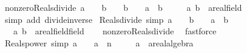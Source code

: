 \begin{isabellebody}
\ nonzero{\isacharunderscore}{\kern0pt}Reals{\isacharunderscore}{\kern0pt}divide{\isacharcolon}{\kern0pt}\ {\isachardoublequoteopen}a\ {\isasymin}\ {\isasymreal}\ {\isasymLongrightarrow}\ b\ {\isasymin}\ {\isasymreal}\ {\isasymLongrightarrow}\ b\ {\isasymnoteq}\ {}\ {\isasymLongrightarrow}\ a\ {\isacharslash}{\kern0pt}\ b\ {\isasymin}\ {\isasymreal}{\isachardoublequoteclose}\isanewline
\ \ \ a\ b\ {\isacharcolon}{\kern0pt}{\isacharcolon}{\kern0pt}\ {\isachardoublequoteopen}{\isacharprime}{\kern0pt}a{\isacharcolon}{\kern0pt}{\isacharcolon}{\kern0pt}real{\isacharunderscore}{\kern0pt}field{\isachardoublequoteclose}\isanewline
%
\isadelimproof
\ \ %
\endisadelimproof
%
\isatagproof
{}\isamarkupfalse%
\ {\isacharparenleft}{\kern0pt}simp\ add{\isacharcolon}{\kern0pt}\ divide{\isacharunderscore}{\kern0pt}inverse{\isacharparenright}{\kern0pt}%
\endisatagproof
{\isafoldproof}%
%
\isadelimproof
\isanewline
%
\endisadelimproof
\isanewline
{}\isamarkupfalse%
\ Reals{\isacharunderscore}{\kern0pt}divide\ {\isacharbrackleft}{\kern0pt}simp{\isacharbrackright}{\kern0pt}{\isacharcolon}{\kern0pt}\ {\isachardoublequoteopen}a\ {\isasymin}\ {\isasymreal}\ {\isasymLongrightarrow}\ b\ {\isasymin}\ {\isasymreal}\ {\isasymLongrightarrow}\ a\ {\isacharslash}{\kern0pt}\ b\ {\isasymin}\ {\isasymreal}{\isachardoublequoteclose}\isanewline
\ \ \ a\ b\ {\isacharcolon}{\kern0pt}{\isacharcolon}{\kern0pt}\ {\isachardoublequoteopen}{\isacharprime}{\kern0pt}a{\isacharcolon}{\kern0pt}{\isacharcolon}{\kern0pt}{\isacharbraceleft}{\kern0pt}real{\isacharunderscore}{\kern0pt}field{\isacharcomma}{\kern0pt}field{\isacharbraceright}{\kern0pt}{\isachardoublequoteclose}\isanewline
%
\isadelimproof
\ \ %
\endisadelimproof
%
\isatagproof
{}\isamarkupfalse%
\ nonzero{\isacharunderscore}{\kern0pt}Reals{\isacharunderscore}{\kern0pt}divide\ \isamarkupfalse%
\ fastforce%
\endisatagproof
{\isafoldproof}%
%
\isadelimproof
\isanewline
%
\endisadelimproof
\isanewline
{}\isamarkupfalse%
\ Reals{\isacharunderscore}{\kern0pt}power\ {\isacharbrackleft}{\kern0pt}simp{\isacharbrackright}{\kern0pt}{\isacharcolon}{\kern0pt}\ {\isachardoublequoteopen}a\ {\isasymin}\ {\isasymreal}\ {\isasymLongrightarrow}\ a\ {\isacharcircum}{\kern0pt}\ n\ {\isasymin}\ {\isasymreal}{\isachardoublequoteclose}\isanewline
\ \ \ a\ {\isacharcolon}{\kern0pt}{\isacharcolon}{\kern0pt}\ {\isachardoublequoteopen}{\isacharprime}{\kern0pt}a{\isacharcolon}{\kern0pt}{\isacharcolon}{\kern0pt}real{\isacharunderscore}{\kern0pt}algebra{\isacharunderscore}{\kern0pt}{}{\isachardoublequoteclose}\isanewline

\end{isabellebody}
